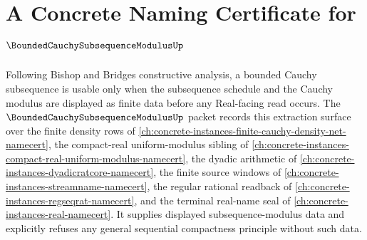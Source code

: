 \chapter{A Concrete Naming Certificate for $\BoundedCauchySubsequenceModulusUp$}
\label{ch:concrete-instances-bounded-cauchy-subsequence-modulus-namecert}

Following Bishop and Bridges constructive analysis, a bounded Cauchy subsequence is usable only when the subsequence schedule and the Cauchy modulus are displayed as finite data before any Real-facing read occurs. The $\BoundedCauchySubsequenceModulusUp$ packet records this extraction surface over the finite density rows of \autoref{ch:concrete-instances-finite-cauchy-density-net-namecert}, the compact-real uniform-modulus sibling of \autoref{ch:concrete-instances-compact-real-uniform-modulus-namecert}, the dyadic arithmetic of \autoref{ch:concrete-instances-dyadicratcore-namecert}, the finite source windows of \autoref{ch:concrete-instances-streamname-namecert}, the regular rational readback of \autoref{ch:concrete-instances-regseqrat-namecert}, and the terminal real-name seal of \autoref{ch:concrete-instances-real-namecert}. It supplies displayed subsequence-modulus data and explicitly refuses any general sequential compactness principle without such data.

